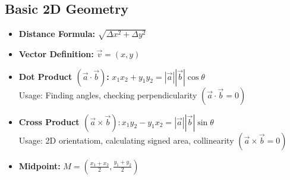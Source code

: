 \subsection{Basic 2D Geometry}

\begin{itemize}
    \item \textbf{Distance Formula: }$\sqrt{\Delta x^2 + \Delta y^2}$
    \item \textbf{Vector Definition: }$\vec{v} = (x,y)$
    \item \textbf{Dot Product $(\vec{a} \cdot \vec{b})$: }$x_1 x_2 + y_1 y_2 = |\vec{a}| |\vec{b}| \cos \theta$ \\ Usage: Finding angles, checking perpendicularity $(\vec{a} \cdot \vec{b} = 0)$
    \item \textbf{Cross Product $(\vec{a} \times \vec{b}): $}$x_1 y_2 - y_1 x_2 = |\vec{a}| |\vec{b}| \sin \theta$ \\ Usage: 2D orientatiom, calculating signed area, collinearity $(\vec{a} \times \vec{b} = 0)$
    \item \textbf{Midpoint: }$M = (\frac{x_1 + x_2}{2}, \frac{y_1 + y_2}{2})$
\end{itemize}